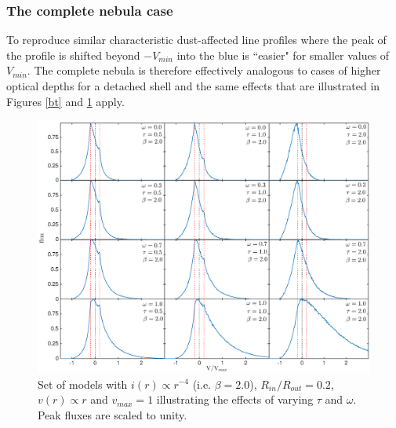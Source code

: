 


\subsubsection{The complete nebula case}

To reproduce similar characteristic dust-affected line profiles where the peak of the profile is shifted beyond $-V_{min}$ into the blue is ``easier" for smaller values of $V_{min}$.  The complete nebula is therefore effectively analogous to cases of higher optical depths for a detached shell and the same effects that are illustrated in Figures \ref{bt} and \ref{wt} apply.


\begin{figure}
\centering
\includegraphics[trim =70 40 40 15,clip=true,scale=0.43]{chapters/chapter4/images/params/C/C_all}
\caption{Set of models with $i(r) \propto r^{-4}$ (i.e. $\beta=2.0$), $R_{in}/R_{out}=0.2$, $v(r) \propto r$  
and $v_{max}=1$ illustrating the effects of varying $\tau$ and $\omega$. 
Peak fluxes are scaled to unity.}
\label{wt}
\end{figure}


